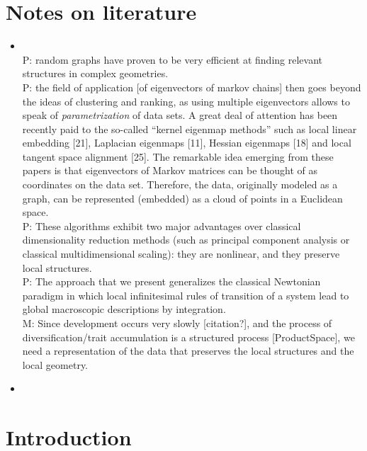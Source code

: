 \documentclass[hidelinks,preprint,12pt]{elsarticle}
\begin{document}
\linenumbers

\section{Notes on literature}

\begin{itemize}
\item \citet{coifman_diffusion_2006} \\ 
P: random graphs have proven to be very efficient at finding relevant structures in complex geometries. \\
P: the field of application [of eigenvectors of markov chains] then goes beyond the ideas of clustering and ranking, as using multiple eigenvectors allows to speak of \emph{parametrization} of data sets. A great deal of attention has been recently paid to the so-called ``kernel eigenmap methods'' such as local linear
embedding [21], Laplacian eigenmaps [11], Hessian eigenmaps [18] and local tangent space alignment [25]. The
remarkable idea emerging from these papers is that eigenvectors of Markov matrices can be thought of as coordinates
on the data set. Therefore, the data, originally modeled as a graph, can be represented (embedded) as a cloud of points
in a Euclidean space. \\
P: These algorithms exhibit two major advantages
over classical dimensionality reduction methods (such as principal component analysis or classical multidimensional
scaling): they are nonlinear, and they preserve local structures. \\
P: The approach that we present generalizes the classical Newtonian paradigm in which
local infinitesimal rules of transition of a system lead to global macroscopic descriptions by integration. \\
M: Since development occurs very slowly [citation?], and the process of diversification/trait accumulation is a structured process [ProductSpace], we need a representation of the data that preserves the local structures and the local geometry. \\




\item \citet{lafon_diffusion_2006}
\end{itemize}


\section{Introduction}
\end{document}
